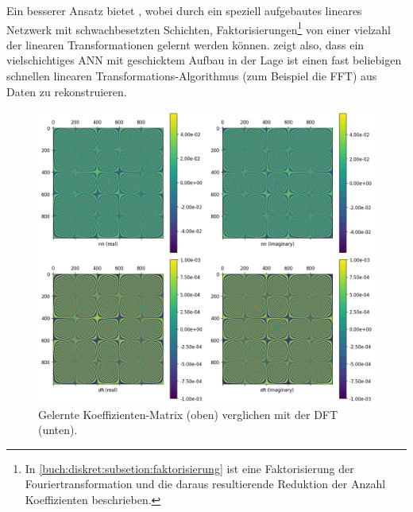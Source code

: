 Ein besserer Ansatz bietet \cite{ml:pmlr-v97-dao19a}, wobei durch ein speziell aufgebautes
lineares Netzwerk mit schwachbesetzten Schichten, Faktorisierungen\footnote{In
\ref{buch:diskret:subsetion:faktorisierung} ist eine Faktorisierung der
Fouriertransformation und die daraus resultierende Reduktion der Anzahl Koeffizienten
beschrieben.} von einer vielzahl der linearen Transformationen gelernt werden können.
\cite{ml:pmlr-v97-dao19a} zeigt also, dass ein vielschichtiges ANN mit geschicktem Aufbau in der Lage ist
einen fast beliebigen schnellen linearen Transformations-Algorithmus (zum Beispiel die FFT)
aus Daten zu rekonstruieren.

\begin{figure}
    \centering
    \includegraphics[width=\textwidth]{papers/ml/images/learned_coeff_vs_dft.png}
    \caption{Gelernte Koeffizienten-Matrix (oben) verglichen mit der DFT (unten).}
    \label{fig:ml:dft-with-ann:leanred-vs-dft}
\end{figure}